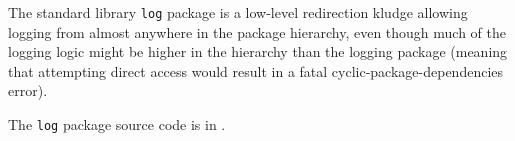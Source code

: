 
The standard library {\tt log} package is a low-level redirection kludge allowing logging from almost anywhere in the package hierarchy, even though much of the logging logic might be higher in the hierarchy than the logging package (meaning that attempting direct access would result in a fatal cyclic-package-dependencies error).

The {\tt log} package source code is in .



